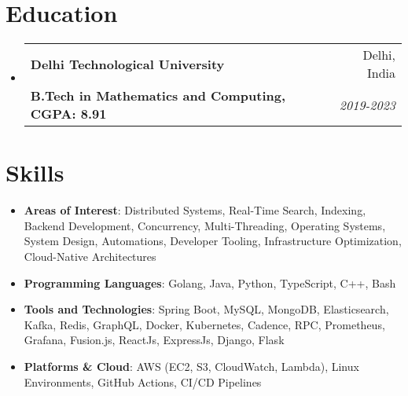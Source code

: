 \documentclass[letterpaper,10.8pt]{article}
\makeatletter
\newcommand{\resumeItem}[2]{
  \item\small{
    \textbf{#1}{: #2 \vspace{-2pt}}
  }
}
\newcommand{\resumeSubheading}[4]{
  \vspace{-1pt}\item
    \begin{tabular*}{0.97\textwidth}{l@{\extracolsep{\fill}}r}
      \textbf{#1} & #2 \\
      \textbf{#3} & \textit{\small #4} \\
    \end{tabular*}\vspace{-5pt}
}
\newcommand{\resumeSubItem}[2]{\resumeItem{#1}{#2}\vspace{-4pt}}
\newcommand{\resumeSubHeadingListStart}{\begin{itemize}[leftmargin=*]}
\newcommand{\resumeSubHeadingListEnd}{\end{itemize}}
\makeatother
\begin{document}



\section{Education}
  \resumeSubHeadingListStart
    \resumeSubheading
      {Delhi Technological University}{Delhi, India }
      {B.Tech in Mathematics and Computing,  CGPA: 8.91}{2019-2023}
  \resumeSubHeadingListEnd


\section{Skills}
  \resumeSubHeadingListStart
	\resumeSubItem{Areas of Interest}{Distributed Systems, Real-Time Search, Indexing, Backend Development, Concurrency, Multi-Threading, Operating Systems, System Design, Automations, Developer Tooling, Infrastructure Optimization, Cloud-Native Architectures}
  
    \resumeSubItem{Programming Languages}{Golang, Java, Python, TypeScript, C++, Bash}
    
    \resumeSubItem{Tools and Technologies}{Spring Boot, MySQL, MongoDB, Elasticsearch, Kafka, Redis, GraphQL, Docker, Kubernetes, Cadence, RPC, Prometheus, Grafana, Fusion.js, ReactJs, ExpressJs, Django, Flask}
    
    \resumeSubItem{Platforms \& Cloud}{AWS (EC2, S3, CloudWatch, Lambda), Linux Environments, GitHub Actions, CI/CD Pipelines}
\resumeSubHeadingListEnd
\end{document}
